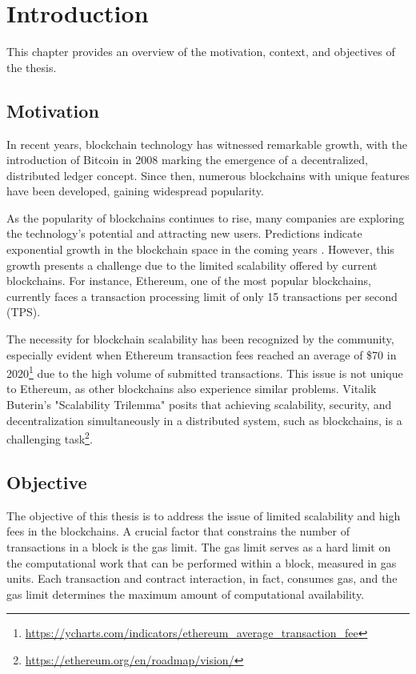 \chapter{Introduction}\label{cha:chapter1}

This chapter provides an overview of the motivation, context, and objectives of the thesis.

\section{Motivation}\label{sec:moti}

In recent years, blockchain technology has witnessed remarkable growth, with the introduction of Bitcoin in 2008 \cite{nakamoto_bitcoin_2008} marking the emergence of a decentralized, distributed ledger concept. Since then, numerous blockchains with unique features have been developed, gaining widespread popularity.

As the popularity of blockchains continues to rise, many companies are exploring the technology's potential and attracting new users. Predictions indicate exponential growth in the blockchain space in the coming years \cite{noauthor_global_nodate}. However, this growth presents a challenge due to the limited scalability offered by current blockchains. For instance, Ethereum, one of the most popular blockchains, currently faces a transaction processing limit of only 15 transactions per second (TPS).

The necessity for blockchain scalability has been recognized by the community, especially evident when Ethereum transaction fees reached an average of \$70 in 2020\footnote{\url{https://ycharts.com/indicators/ethereum_average_transaction_fee}} due to the high volume of submitted transactions. This issue is not unique to Ethereum, as other blockchains also experience similar problems. Vitalik Buterin's "Scalability Trilemma" posits that achieving scalability, security, and decentralization simultaneously in a distributed system, such as blockchains, is a challenging task\footnote{\url{https://ethereum.org/en/roadmap/vision/}}.

\section{Objective}\label{sec:objective}

The objective of this thesis is to address the issue of limited scalability and high fees in the blockchains. A crucial factor that constrains the number of transactions in a block is the gas limit. The gas limit serves as a hard limit on the computational work that can be performed within a block, measured in gas units. Each transaction and contract interaction, in fact, consumes gas, and the gas limit determines the maximum amount of computational availability.


